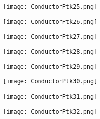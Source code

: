\documentclass[pdf]{beamer}
\begin{document}
\begin{frame}
\begin{figure}[!h]
\centering
\texttt{[image: ConductorPtk25.png]}
\end{figure}
\end{frame}

\begin{frame}
\begin{figure}[!h]
\centering
\texttt{[image: ConductorPtk26.png]}
\end{figure}
\end{frame}

\begin{frame}
\begin{figure}[!h]
\centering
\texttt{[image: ConductorPtk27.png]}
\end{figure}
\end{frame}

\begin{frame}
\begin{figure}[!h]
\centering
\texttt{[image: ConductorPtk28.png]}
\end{figure}
\end{frame}

\begin{frame}
\begin{figure}[!h]
\centering
\texttt{[image: ConductorPtk29.png]}
\end{figure}
\end{frame}

\begin{frame}
\begin{figure}[!h]
\centering
\texttt{[image: ConductorPtk30.png]}
\end{figure}
\end{frame}

\begin{frame}
\begin{figure}[!h]
\centering
\texttt{[image: ConductorPtk31.png]}
\end{figure}
\end{frame}

\begin{frame}
\begin{figure}[!h]
\centering
\texttt{[image: ConductorPtk32.png]}
\end{figure}
\end{frame}
\end{document}
